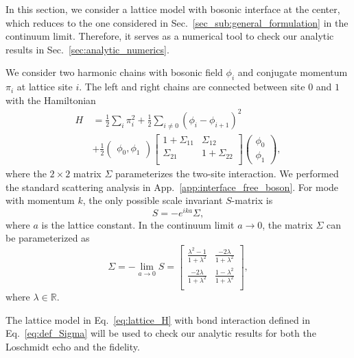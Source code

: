 
In this section, we consider a lattice model with bosonic interface at the center\cite{peschel_exact_2012,calabrese_entanglement_2012}, which reduces to the one considered in Sec.~\ref{sec_sub:general_formulation} in the continuum limit\cite{sakai_entanglement_2008}. Therefore, it serves as a numerical tool to check our analytic results in Sec.~\ref{sec:analytic_numerics}. 


We consider two harmonic chains with bosonic field $\phi_i$ and conjugate momentum $\pi_i$ at lattice site $i$. The left and right chains are connected between site $0$ and $1$ with the Hamiltonian
\begin{equation}
\begin{aligned}
\label{eq:lattice_H}
H &= \frac{1}{2} \sum_i \pi_i^2  +  \frac{1}{2} \sum_{i\ne 0 }  ( \phi_i - \phi_{i+1} )^2 \\
\quad & + \frac{1}{2} \begin{pmatrix}  \phi_0, \phi_1 \end{pmatrix}
\begin{bmatrix}
1 + \Sigma_{11}  & \Sigma_{12} \\
\Sigma_{21} &  1 + \Sigma_{22} \\
\end{bmatrix}
\begin{pmatrix}
\phi_0 \\
\phi_1 
\end{pmatrix},
\end{aligned}
\end{equation}
where the $2\times2$ matrix $\Sigma$ parameterizes the two-site interaction. We performed the standard scattering analysis in App.~\ref{app:interface_free_boson}. For mode with momentum $k$, the only possible scale invariant $S$-matrix is
\begin{equation}
S = - e^{ika} \Sigma,
\end{equation}
where $a$ is the lattice constant. In the continuum limit $a\rightarrow0$, the matrix $\Sigma$ can be parameterized as
\begin{equation}
\label{eq:def_Sigma}
\Sigma = -\lim_{a \rightarrow 0 } S = 
\begin{bmatrix}
\frac{\lambda^2- 1}{1 + \lambda^2} & \frac{-2\lambda }{1 + \lambda^2} \\
\frac{-2\lambda }{1 + \lambda^2} & \frac{1- \lambda^2}{1 + \lambda^2} \\
\end{bmatrix},
\end{equation}
where $\lambda\in\mathbb{R}$. 

The lattice model in Eq.~\eqref{eq:lattice_H} with bond interaction defined in Eq.~\eqref{eq:def_Sigma} will be used to check our analytic results for both the Loschmidt echo and the fidelity.


